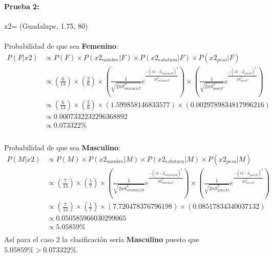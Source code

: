 \documentclass[12pt]{article}
\begin{document}
 \paragraph{Prueba 2: }x2= (Guadalupe, 1.75, 80)
 \paragraph{}Probabilidad de que sea \textbf{Femenino}:\\
 \begin{equation}
 \begin{split}
 P(F|x2) &\propto P(F) \times P(x2_{nombre}|F) \times P(x2_{estatura}|F) \times P(x2_{peso}|F) \\
 &\propto (\frac{6}{13}) \times (\frac{2}{6}) \times (\frac{1}{\sqrt{2\pi\hat{\sigma}_{\text{estatura}|F}^2}}e^{\frac{-(x2 - \hat{\mu}_{\text{estatura}|F})^2}{2\hat{\sigma}_{\text{estatura}|F}^2}}) \times (\frac{1}{\sqrt{2\pi\hat{\sigma}_{\text{peso}|F}^2}}e^{\frac{-(x2 - \hat{\mu}_{\text{peso}|F})^2}{2\hat{\sigma}_{\text{peso}|F}^2}}) \\
 &\propto (\frac{6}{13}) \times (\frac{2}{6}) \times (1.599858146833577) \times (0.0029789834817996216) \\
 &\propto 0.0007332232296368892 \\
 &\propto 0.073322\% \\
 \end{split}
 \end{equation}
 \paragraph{}Probabilidad de que sea \textbf{Masculino}:\\
 \begin{equation}
 \begin{split}
 P(M|x2) &\propto P(M) \times P(x2_{nombre}|M) \times P(x2_{estatura}|M) \times P(x2_{peso}|M) \\
 &\propto (\frac{7}{13}) \times (\frac{1}{7}) \times (\frac{1}{\sqrt{2\pi\hat{\sigma}_{\text{estatura}|M}^2}}e^{\frac{-(x2 - \hat{\mu}_{\text{estatura}|M})^2}{2\hat{\sigma}_{\text{estatura}|F}^2}}) \times (\frac{1}{\sqrt{2\pi\hat{\sigma}_{\text{peso}|M}^2}}e^{\frac{-(x2 - \hat{\mu}_{\text{peso}|M})^2}{2\hat{\sigma}_{\text{peso}|M}^2}}) \\
 &\propto (\frac{7}{13}) \times (\frac{1}{7}) \times (7.720478376796198) \times (0.08517834340037132) \\
 &\propto 0.050585966030299065 \\
 &\propto 5.05859 \% \\
 \end{split}
 \end{equation}
 Así para el caso 2 la clasificación sería \textbf{Masculino} puesto que $5.05859\% > 0.073322\%$.\\
 \clearpage
 \pagebreak
\end{document}
